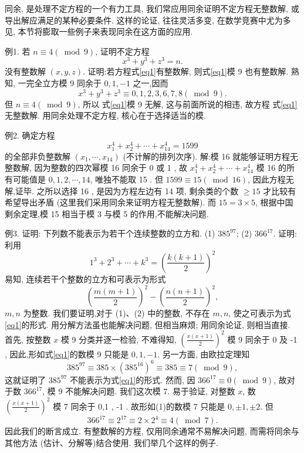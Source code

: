 
同余, 是处理不定方程的一个有力工具, 我们常应用同余证明不定方程无整数解, 或导出解应满足的某种必要条件.
这样的论证, 往往灵活多变, 在数学竞赛中尤为多见, 本节将膨取一些例子来表现同余在这方面的应用.



例1. 若 $n \equiv 4(\bmod 9)$, 证明不定方程
$$
x^3+y^3+z^3=n . \label{eq1}
$$
没有整数解 $(x, y, z)$.
证明:若方程式\ref{eq1}有整数解, 则式\ref{eq1}模 9 也有整数解.
熟知, 一完全立方模 9 同余于 $0,1,-1$ 之一,因而
$$
x^3+y^3+z^3 \equiv 0,1,2,3,6,7,8(\bmod 9) .
$$
但 $n \equiv 4(\bmod 9)$, 所以 式\ref{eq1}模 9 无解, 这与前面所说的相违, 故方程 式\ref{eq1}无整数解.
用同余处理不定方程, 核心在于选择适当的模.



例2. 确定方程
$$
x_1^4+x_2^4+\cdots+x_{14}^4=1599
$$
的全部非负整数解 $\left(x_1, \cdots, x_{14}\right)$ (不计解的排列次序).
解:模 16 就能够证明方程无整数解, 因为整数的四次幂模 16 同余于 0 或 1 , 故 $x_1^4+x_2^4+\cdots+x_{14}^4$ 模 16 的所有可能值是 $0,1,2, \cdots, 14$, 唯独不能取 15 . 但 $1599 \equiv 15(\bmod 16)$, 因此方程无解,证毕.
之所以选择 16 , 是因为方程左边有 14 项, 剩余类的个数 $\geqslant 15$ 才比较有希望导出矛盾 (这里我们采用同余来证明方程无整数解). 而 $15=3 \times 5$, 根据中国剩余定理,模 15 相当于模 3 与模 5 的作用,不能解决问题.



例3. 证明: 下列数不能表示为若干个连续整数的立方和.
(1) $385^{97}$;
(2) $366^{17}$.
证明:利用
$$
1^3+2^3+\cdots+k^3=\left(\frac{k(k+1)}{2}\right)^2
$$
易知, 连续若干个整数的立方和可表示为形式
$$
\left(\frac{m(m+1)}{2}\right)^2-\left(\frac{n(n+1)}{2}\right)^2, \label{eq1}
$$
$m, n$ 为整数.
我们要证明,对于 (1)、(2) 中的整数, 不存在 $m, n$, 使之可表示为式\ref{eq1}的形式.
用分解方法虽也能解决问题, 但相当麻烦; 用同余论证, 则相当直接.
首先, 按整数 $x$ 模 9 分类并逐一检验, 不难得知, $\left(\frac{x(x+1)}{2}\right)^2$ 模 9 同余于 0 及 -1 , 因此,形如式\ref{eq1}的数模 9 只能是 $0,1,-1$. 另一方面, 由欧拉定理知
$$
385^{97} \equiv 385 \times\left(385^{16}\right)^6 \equiv 385 \equiv 7(\bmod 9),
$$
这就证明了 $385^{97}$ 不能表示为式\ref{eq1}的形式.
然而, 因 $366^{17} \equiv 0(\bmod 9)$, 故对于数 $366^{17}$, 模 9 不能解决问题.
我们这次模 7. 易于验证, 对整数 $x$, 数 $\left(\frac{x(x+1)}{2}\right)^2$ 模 7 同余于 0,1 , -1 . 故形如(1)的数模 7 只能是 $0, \pm 1, \pm 2$. 但
$$
366^{17} \equiv 2^{17} \equiv 2 \times 2^4 \equiv 4(\bmod 7) .
$$
因此我们的断言成立.
有整数解的方程, 仅用同余通常不易解决问题, 而需将同余与其他方法 (估计、分解等)结合使用.
我们举几个这样的例子.



